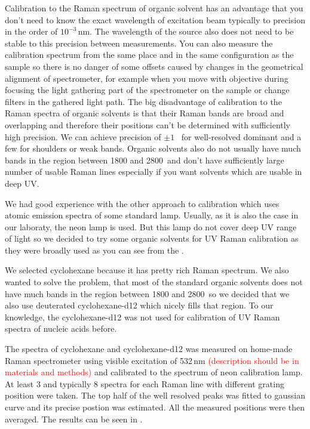 %

Calibration to the Raman spectrum of organic solvent has an advantage that
you don't need to know the exact wavelength of excitation beam typically to
precision in the order of $10^{-3}$\,nm. The wavelength of the source also
does not need to be stable to this precision between measurements. You can
also measure the calibration spectrum from the same place and in the same
configuration as the sample so there is no danger of some offsets caused by
changes in the geometrical alignment of spectrometer, for example when you
move with objective during focusing the light gathering part of the
spectrometer on the sample or change filters in the gathered light path. The
big disadvantage of calibration to the Raman spectra of organic solvents is
that their Raman bands are broad and overlapping and therefore their
positions can't be determined with sufficiently high precision. We can
achieve precision of $\pm1$ \,\icm{} for well-resolved dominant and a few
\icm{} for shoulders or weak bands. Organic solvents also do not usually have
much bands in the region between 1800 and 2800\,\icm{} and don't have
sufficiently large number of usable Raman lines especially if you want
solvents which are usable in deep UV.

We had good experience with the other approach to calibration which uses
atomic emission spectra of some standard lamp. Usually, as it is also the
case in our laboraty, the neon lamp is used. But this lamp do not cover deep
UV range of light so we decided to try some organic solvents for UV Raman
calibration as they were broadly used as you can see from the
.

We selected cyclohexane because it has pretty rich Raman spectrum. We also
wanted to solve the problem, that most of the standard organic solvents
does not have much bands in the region between 1800 and 2800\,\icm{} so we
decided that we also use deuterated cyclohexane-d12 which nicely fills that
region. To our knowledge, the cyclohexane-d12 was not used for calibration of
UV Raman spectra of nucleic acids before.

The spectra of cyclohexane and cyclohexane-d12 was measured on home-made Raman
spectrometer using visible excitation of 532\,nm \REFERENCE{}
\textcolor{red}{(description should be in materials and methods)}
and calibrated to the spectrum of neon calibration lamp. At least 3 and
typically 8 spectra for each Raman line with different grating position were
taken. The top half of the well resolved peaks was fitted to gaussian
curve and its precise postion was estimated. All the measured positions were
then averaged. The results can be seen in
.

